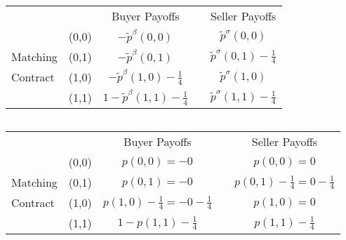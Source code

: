 \documentclass[12pt,letterpaper]{article}           %
\begin{document}


\begin{table}[]
	\begin{tabular}{lcccc}
		&                            & Buyer Payoffs         &                       & Seller Payoffs        \\ \cline{3-3} \cline{5-5} 
		& \multicolumn{1}{c|}{(0,0)} & \multicolumn{1}{c|}{$ -\tilde{p}^\beta(0,0)$} & \multicolumn{1}{c|}{} & \multicolumn{1}{c|}{$ \tilde{p}^\sigma(0,0)$} \\ \cline{3-3} \cline{5-5} 
		Matching & \multicolumn{1}{c|}{(0,1)} & \multicolumn{1}{c|}{$ -\tilde{p}^\beta(0,1)$} & \multicolumn{1}{c|}{} & \multicolumn{1}{c|}{$ \tilde{p}^\sigma(0,1) -\frac{1}{4}$}  \\ \cline{3-3} \cline{5-5} 
		Contract& \multicolumn{1}{c|}{(1,0)} & \multicolumn{1}{c|}{$ -\tilde{p}^\beta(1,0) - \frac{1}{4}$} & \multicolumn{1}{c|}{} & \multicolumn{1}{c|}{$ \tilde{p}^\sigma(1,0)$} \\ \cline{3-3} \cline{5-5} 
		& \multicolumn{1}{c|}{(1,1)} & \multicolumn{1}{c|}{$ 1- \tilde{p}^\beta(1,1) - \frac{1}{4}$} & \multicolumn{1}{c|}{} & \multicolumn{1}{c|}{$ \tilde{p}^\sigma(1,1)- \frac{1}{4}$} \\ \cline{3-3} \cline{5-5} 
	\end{tabular}
\end{table}

$ $

\newpage


\begin{table}[]
	\begin{tabular}{lcccc}
		&                            & Buyer Payoffs         &                       & Seller Payoffs        \\ \cline{3-3} \cline{5-5} 
		& \multicolumn{1}{c|}{(0,0)} & \multicolumn{1}{c|}{$p(0,0)= -0$} & \multicolumn{1}{c|}{} & \multicolumn{1}{c|}{$p(0,0)=  0$} \\ \cline{3-3} \cline{5-5} 
		Matching & \multicolumn{1}{c|}{(0,1)} & \multicolumn{1}{c|}{$p(0,1)= -0$} & \multicolumn{1}{c|}{} & \multicolumn{1}{c|}{$p(0,1) -\frac{1}{4}= 0 -\frac{1}{4}$}  \\ \cline{3-3} \cline{5-5} 
		Contract& \multicolumn{1}{c|}{(1,0)} & \multicolumn{1}{c|}{$ p(1,0) - \frac{1}{4}= - 0 - \frac{1}{4}$} & \multicolumn{1}{c|}{} & \multicolumn{1}{c|}{$p(1,0)=  0$} \\ \cline{3-3} \cline{5-5} 
		& \multicolumn{1}{c|}{(1,1)} & \multicolumn{1}{c|}{$ 1-p(1,1) - \frac{1}{4}$} & \multicolumn{1}{c|}{} & \multicolumn{1}{c|}{$ p(1,1)- \frac{1}{4}$} \\ \cline{3-3} \cline{5-5} 
	\end{tabular}
\end{table}
\end{document}
